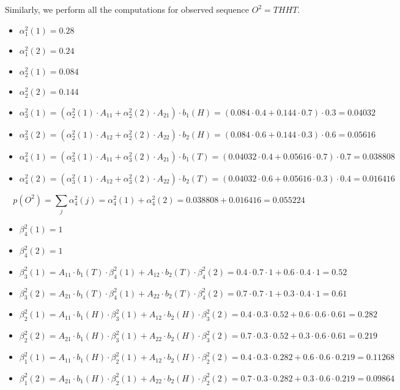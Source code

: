 \documentclass[11pt,a4paper]{article}
\begin{document}
	
Similarly, we perform all the computations for observed sequence $O^2 = THHT$.

\begin{itemize}
	\item $\alpha_1^2(1) = 0.28$
	\item $\alpha_1^2(2) = 0.24$
	\item $\alpha_2^2(1) = 0.084$
	\item $\alpha_2^2(2) = 0.144$
	\item $\alpha_3^2(1) = (\alpha_2^2(1) \cdot A_{11} + \alpha_2^2(2) \cdot A_{21}) \cdot b_1(H) = (0.084 \cdot 0.4 + 0.144 \cdot 0.7) \cdot 0.3 = 0.04032$
	\item $\alpha_3^2(2) = (\alpha_2^2(1) \cdot A_{12} + \alpha_2^2(2) \cdot A_{22}) \cdot b_2(H) = (0.084 \cdot 0.6 + 0.144 \cdot 0.3) \cdot 0.6 = 0.05616$
	\item $\alpha_4^2(1) = (\alpha_3^2(1) \cdot A_{11} + \alpha_3^2(2) \cdot A_{21}) \cdot b_1(T) = (0.04032 \cdot 0.4 + 0.05616 \cdot 0.7) \cdot 0.7 = 0.038808$	
	\item $\alpha_4^2(2) = (\alpha_3^2(1) \cdot A_{12} + \alpha_3^2(2) \cdot A_{22}) \cdot b_2(T) = (0.04032 \cdot 0.6 + 0.05616 \cdot 0.3) \cdot 0.4 = 0.016416$
	
\end{itemize}

	$$ p(O^2) = \sum_{j} \alpha_4^2(j) = \alpha_4^2(1) + \alpha_4^2(2) = 0.038808 + 0.016416 = 0.055224 $$ 
	
	\begin{itemize}
		\item $ \beta_4^2(1) = 1 $
		\item $ \beta_4^2(2) = 1 $
		\item $ \beta_3^2(1) = A_{11} \cdot b_1(T) \cdot \beta_4^2(1) +  A_{12} \cdot b_2(T) \cdot \beta_4^2(2) = 0.4 \cdot 0.7 \cdot 1 + 0.6 \cdot 0.4 \cdot 1 = 0.52$
		\item $ \beta_3^2(2) = A_{21} \cdot b_1(T) \cdot \beta_4^2(1) +  A_{22} \cdot b_2(T) \cdot \beta_4^2(2) = 0.7 \cdot 0.7 \cdot 1 + 0.3 \cdot 0.4 \cdot 1 = 0.61$
		\item $ \beta_2^2(1) = A_{11} \cdot b_1(H) \cdot \beta_3^2(1) +  A_{12} \cdot b_2(H) \cdot \beta_3^2(2) = 0.4 \cdot 0.3 \cdot 0.52 + 0.6 \cdot 0.6 \cdot 0.61 = 0.282$
		\item $ \beta_2^2(2) = A_{21} \cdot b_1(H) \cdot \beta_3^2(1) +  A_{22} \cdot b_2(H) \cdot \beta_3^2(2) = 0.7 \cdot 0.3 \cdot 0.52 + 0.3 \cdot 0.6 \cdot 0.61 = 0.219$
		\item $ \beta_1^2(1) = A_{11} \cdot b_1(H) \cdot \beta_2^2(1) +  A_{12} \cdot b_2(H) \cdot \beta_2^2(2) = 0.4 \cdot 0.3 \cdot 0.282 + 0.6 \cdot 0.6 \cdot 0.219 = 0.11268$
		\item $ \beta_1^2(2) = A_{21} \cdot b_1(H) \cdot \beta_2^2(1) +  A_{22} \cdot b_2(H) \cdot \beta_2^2(2) = 0.7 \cdot 0.3 \cdot 0.282 + 0.3 \cdot 0.6 \cdot 0.219 = 0.09864$
	\end{itemize}
	
\end{document}

